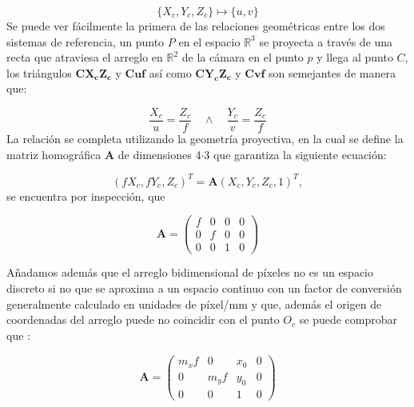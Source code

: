 \documentclass[UTF8]{article}
\begin{document}
\begin{equation}
 \{X_{c},Y_{c},Z_{c}\} \mapsto \{u,v\}     
\end{equation}
%
Se puede ver fácilmente la primera de las relaciones geométricas entre los dos sistemas de referencia, un punto $P$ en el espacio $\mathbb{R}^3$ se proyecta a través de una recta que atraviesa el arreglo en $\mathbb{R}^2$ de la cámara en el punto $p$ y llega al punto $C$, los triángulos  $\mathbf{CX_{c}Z_{c}}$ y $\mathbf{Cuf}$  así como  $\mathbf{CY_{c}Z_{c}}$ y  $\mathbf{Cvf}$ son semejantes de manera que:  
\medskip

\begin{equation}
\frac{X_{c}}{u} = \frac{Z_{c}}{f} \quad \wedge \quad \frac{Y_{c}}{v} = \frac{Z_{c}}{f}    
\end{equation}
%
La relación se completa utilizando la geometría proyectiva, en la cual se define la matriz homográfica \textbf{A} de dimensiones 4$\cdot$3 que garantiza la siguiente ecuación:

\begin{equation}
 ( fX_{c},fY_{c},Z_{c})^T  = \mathbf{A}  (X_{c},Y_{c},Z_{c},1)^T,
\end{equation}
%
se encuentra por inspección, que 

\begin{equation}
 \mathbf{A}   = \left( \begin{array}{cccc}
f & 0 & 0 & 0\\
0 & f & 0 & 0\\
0 & 0 & 1 & 0\end{array} \right) 
\end{equation}

Añadamos además que el arreglo bidimensional de píxeles no es un espacio discreto si no que se aproxima a un espacio continuo con un factor de conversión generalmente calculado en unidades de píxel/mm y que, además el origen de coordenadas del arreglo puede no coincidir con el punto $O_{c}$ se puede comprobar que :
\medskip

\begin{equation}
 \mathbf{A}   = \left( \begin{array}{cccc}
m_{x}f & 0 & x_{0} & 0\\
0 & m_{y}f & y_{0} & 0\\
0 & 0 & 1 & 0\end{array} \right) 
\end{equation}
\end{document}
